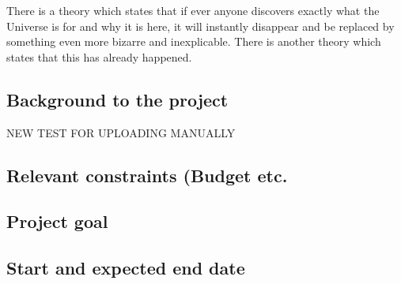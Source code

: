 There is a theory which states that if ever anyone discovers exactly what the Universe is for and why it is here, it will instantly disappear and be replaced by something even more bizarre and inexplicable.
There is another theory which states that this has already happened.

\subsection{Background to the project}
NEW TEST FOR UPLOADING MANUALLY
\subsection{Relevant constraints (Budget etc.}

\subsection{Project goal}

\subsection{Start and expected end date}